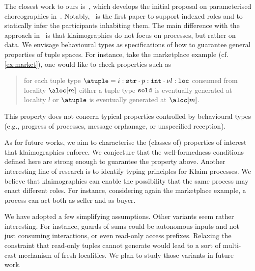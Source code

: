 The closest work to ours is~\cite{chjny19}, which develops the initial
proposal on parameterised choreographies in~\cite{ydbh10,dybh12}.
%
Notably,~\cite{chjny19} is the first paper to support indexed roles and
to statically infer the participants inhabiting them.
%
The main difference with the approach in~\cite{chjny19} is that
klaimographies do not focus on processes, but rather on data.
%
We envisage behavioural types as specifications of how to guarantee
general properties of tuple spaces.
%
For instance, take the marketplace example (cf. \cref{ex:market}),
one would like to check properties such as
\begin{quote}
  for each tuple type
  $\atuple = {{i : \asort[str]} \cdot {p : \asort[int]} \cdot {\nu l :
      \asort[loc]}}$ consumed from locality $\aloc[m]$ either a tuple type
  $\asort[sold]$ is eventually generated at locality $l$ or $\atuple$
  is eventually generated at $\aloc[m]$.
\end{quote}
%
This property does not concern typical properties
controlled by behavioural types (e.g., progress of processes, message
orphanage, or unspecified reception).

As for future works, we aim to characterise the (classes of)
properties of interest that klaimographies enforce.
%
We conjecture that the well-formedness conditions defined here
are strong enough to guarantee the property above.
%
Another interesting line of research is to identify typing principles
for Klaim processes.
%
We believe that klaimographies can enable the possibility that the same
process may enact different roles.
%
For instance, considering again the marketplace example, a process
can act both as seller and as buyer.

We have adopted a few simplifying assumptions.
%
Other variants seem rather interesting.
%
For instance, guards of sums could be autonomous inputs and not just
consuming interactions, or even read-only access prefixes.
%
Relaxing the constraint that read-only tuples cannot generate would
lead to a sort of multi-cast mechanism of fresh localities.
%
We plan to study those variants in future work.


